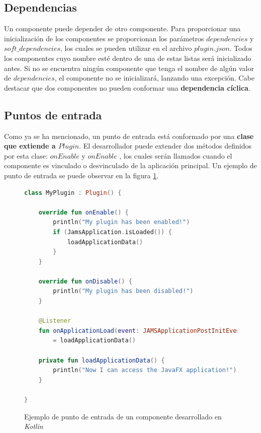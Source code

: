 \subsection{Dependencias}\label{subsec:dependencias}

Un componente puede depender de otro componente.
Para proporcionar una inicialización  de los componentes
 se proporcionan los parámetros $dependencies$
y $soft\_dependencies$, los cuales se pueden utilizar en
el archivo $plugin.json$.
Todos los componentes cuyo nombre esté dentro de una de estas
listas será inicializado antes.
Si no se encuentra ningún componente que tenga el nombre
de algún valor de $dependencies$, el componente no
se inicializará, lanzando una excepción.
Cabe destacar que dos componentes no pueden conformar
una \textbf{dependencia cíclica}.

\subsection{Puntos de entrada}\label{subsec:puntos-de-entrada}

Como ya se ha mencionado, un punto de entrada está conformado
por una \textbf{clase que extiende a $Plugin$}.
El desarrollador puede extender dos métodos definidos por esta clase:
$onEnable$ y $onEnable$ , los cuales serán llamados cuando el
componente es vinculado o desvinculado de la aplicación principal.
Un ejemplo de punto de entrada se puede observar en la figura \ref{fig:entry-point}.

\begin{figure}[h]
    \centering
    \begin{lstlisting}[frame=single,label={lst:entry-point},language=Kotlin]
class MyPlugin : Plugin() {

    override fun onEnable() {
        println("My plugin has been enabled!")
        if (JamsApplication.isLoaded()) {
            loadApplicationData()
        }
    }

    override fun onDisable() {
        println("My plugin has been disabled!")
    }

    @Listener
    fun onApplicationLoad(event: JAMSApplicationPostInitEvent)
        = loadApplicationData()

    private fun loadApplicationData() {
        println("Now I can access the JavaFX application!")
    }

}
    \end{lstlisting}
    \caption{Ejemplo de punto de entrada de un componente desarrollado en \textit{Kotlin}}
    \label{fig:entry-point}
\end{figure}


